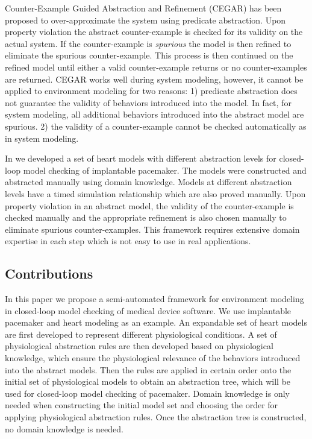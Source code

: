 Counter-Example Guided Abstraction and Refinement (CEGAR) \cite{CEGAR} has been proposed to over-approximate the system using predicate abstraction. Upon property violation the abstract counter-example is checked for its validity on the actual system. If the counter-example is \emph{spurious} the model is then refined to eliminate the spurious counter-example. This process is then continued on the refined model until either a valid counter-example returns or no counter-examples are returned. CEGAR works well during system modeling, however, it cannot be applied to environment modeling for two reasons: 1) predicate abstraction does not guarantee the validity of behaviors introduced into the model. In fact, for system modeling, all additional behaviors introduced into the abstract model are spurious. 2) the validity of a counter-example cannot be checked automatically as in system modeling.

In \cite{sttt13} we developed a set of heart models with different abstraction levels for closed-loop model checking of implantable pacemaker. The models were constructed and abstracted manually using domain knowledge. Models at different abstraction levels have a timed simulation relationship which are also proved manually. Upon property violation in an abstract model, the validity of the counter-example is checked manually and the appropriate refinement is also chosen manually to eliminate spurious counter-examples. This framework requires extensive domain expertise in each step which is not easy to use in real applications.

\subsection{Contributions}
In this paper we propose a semi-automated framework for environment modeling in closed-loop model checking of medical device software. We use implantable pacemaker and heart modeling as an example. An expandable set of heart models are first developed to represent different physiological conditions. A set of physiological abstraction rules are then developed based on physiological knowledge, which ensure the physiological relevance of the behaviors introduced into the abstract models. Then the rules are applied in certain order onto the initial set of physiological models to obtain an abstraction tree, which will be used for closed-loop model checking of pacemaker. Domain knowledge is only needed when constructing the initial model set and choosing the order for applying physiological abstraction rules. Once the abstraction tree is constructed, no domain knowledge is needed. 

